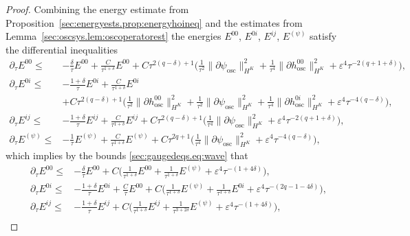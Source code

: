 \documentclass{article}
\newcommand{\osc}{\mathrm{osc}}
\newcommand{\ve}{\varepsilon}
\newcommand{\pa}{\partial}
\begin{document}
\begin{proof}
    Combining the energy estimate from Proposition~\ref{sec:energyests.prop:energyhoineq} and the estimates from Lemma~\ref{sec:oscsys.lem:oscoperatorest} the energies $E^{00}$, $E^{0i}$, $E^{ij}$, $E^{(\psi)}$ satisfy the differential inequalities
    \begin{subequations}
        \begin{align}
            \pa_\tau E^{00} \leq &-\frac{\delta}{\tau}E^{00} + \frac{C}{\tau^{1+\delta}}E^{00} + C\tau^{2(q-\delta)+1}\Big(\frac{1}{\tau^2}\|\pa \psi_{\osc}\|_{H^K}^2 + \frac{1}{\tau^4}\|\pa h_{\osc}^{00}\|_{H^K}^2 + \ve^4\tau^{-2(q+1+\delta)}\Big),\\
            \pa_\tau E^{0i}\leq &-\frac{1+\delta}{\tau}E^{0i} + \frac{C}{\tau^{1+\delta}}E^{0i}\\
            &+ C\tau^{2(q-\delta)+1}\Big(\frac{1}{\tau^2}\|\pa h_{\osc}^{00}\|_{H^K}^2+\frac{1}{\tau^2}\|\pa \psi_{\osc}\|_{H^K}^2 + \frac{1}{\tau^4}\|\pa h_{\osc}^{0i}\|_{H^K}^2+\ve^4 \tau^{-4(q-\delta)}\Big),\\
            \pa_\tau E^{ij}\leq &-\frac{1+\delta}{\tau}E^{ij} + \frac{C}{\tau^{1+\delta}}E^{ij}+ C\tau^{2(q-\delta)+1}\Big(\frac{1}{\tau^4}\|\pa \psi_{\osc}\|_{H^K}^2+\ve^4 \tau^{-2(q+1+\delta)}\Big),\\
            \pa_\tau E^{(\psi)}\leq &-\frac{1}{\tau}E^{(\psi)} + \frac{C}{\tau^{1+\delta}}E^{(\psi)}+ C\tau^{2q+1}\Big(\frac{1}{\tau^4}\|\pa \psi_{\osc}\|_{H^K}^2+\ve^4 \tau^{-4(q-\delta)}\Big),
        \end{align}
    \end{subequations}
    which implies by the bounds \eqref{sec:gaugedeqs.eq:wave} that
    \begin{subequations}
        \begin{align}
            \pa_\tau E^{00} \leq &-\frac{\delta}{\tau}E^{00}+\boxed{C\Big(\frac{1}{\tau^{1+\delta}}E^{00} + \frac{1}{\tau^{1+\delta}}E^{(\psi)} + \ve^4 \tau^{-(1+4\delta)}\Big)},
            \label{sec:oscsys.eq:oscestproof1}\\
            \pa_\tau E^{0i}\leq &-\frac{1+\delta}{\tau}E^{0i}+ \frac{C}{\tau}E^{00} + \boxed{C\Big(\frac{1}{\tau^{1+\delta}}E^{(\psi)}+\frac{1}{\tau^{1+\delta}}E^{0i}+\ve^4\tau^{-(2q-1-4\delta)}\Big)},\label{sec:oscsys.eq:oscestproof2}\\
            \pa_\tau E^{ij}\leq &-\frac{1+\delta}{\tau}E^{ij} + \boxed{C\Big(\frac{1}{\tau^{1+\delta}}E^{ij}+\frac{1}{\tau^{3+2\delta}}E^{(\psi)}+\ve^4 \tau^{-(1+4\delta)}\Big)},\\

\end{align}
\end{subequations}
\end{proof}
\end{document}

